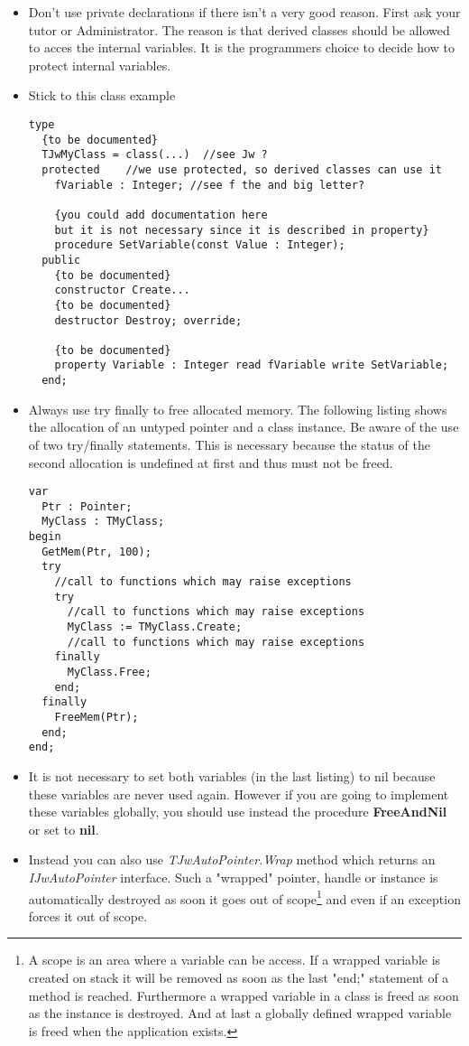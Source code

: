 \documentclass[a4paper,oneside,10pt]{article}
\begin{document}
\begin{itemize}
	\item Don't use private declarations if there isn't a very good reason. First ask your tutor or Administrator. The reason is that derived classes should be allowed to acces the internal variables. It is the programmers choice to decide how to protect internal variables.
	\item Stick to this class example 
\begin{lstlisting}	
type
  {to be documented}
  TJwMyClass = class(...)  //see Jw ?
  protected    //we use protected, so derived classes can use it
    fVariable : Integer; //see f the and big letter?

    {you could add documentation here
    but it is not necessary since it is described in property}
    procedure SetVariable(const Value : Integer);
  public
    {to be documented}
    constructor Create...
    {to be documented}
    destructor Destroy; override;

    {to be documented}
    property Variable : Integer read fVariable write SetVariable;
  end;	
\end{lstlisting}
 
\item Always use try finally to free allocated memory. The following listing shows the allocation of an untyped pointer and a class instance. Be aware of the use of two try/finally statements. This is necessary because the status of the second allocation is undefined at first and thus must not be freed.

\begin{lstlisting}
var 
  Ptr : Pointer;
  MyClass : TMyClass;
begin
  GetMem(Ptr, 100);
  try
    //call to functions which may raise exceptions
    try
      //call to functions which may raise exceptions
      MyClass := TMyClass.Create;
      //call to functions which may raise exceptions
    finally
      MyClass.Free;
    end;
  finally
    FreeMem(Ptr);
  end;
end;
\end{lstlisting}

\item It is not necessary to set both variables (in the last listing) to nil because these variables are never used again. However if you are going to implement these variables globally, you should use instead the procedure \textbf{FreeAndNil} or set to \textbf{nil}.

\item Instead you can also use \textit{TJwAutoPointer.Wrap} method which returns an \textit{IJwAutoPointer} interface. Such a "wrapped" pointer, handle or instance is automatically destroyed as soon it goes out of scope\footnote{A scope is an area where a variable can be access. If a wrapped variable is created on stack it will be removed as soon as the last "end;" statement of a method is reached. Furthermore a wrapped variable in a class is freed as soon as the instance is destroyed. And at last a globally defined wrapped variable is freed when the application exists.} and even if an exception forces it out of scope.


\end{itemize}
\end{document}
